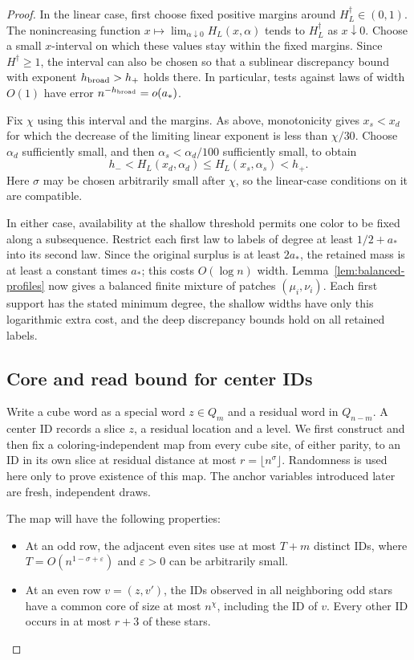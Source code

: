 \begin{proof}
In the linear case, first choose fixed positive margins around \(H_L^\dagger\in(0,1)\). The nonincreasing function
\(x\mapsto\lim_{\alpha\downarrow0}H_L(x,\alpha)\)
tends to \(H_L^\dagger\) as \(x\downarrow0\). Choose a small \(x\)-interval on which these values stay within the fixed margins. Since \(H^\dagger\ge1\), the interval can also be chosen so that a sublinear discrepancy bound with exponent \(h_{\rm broad}>h_+\) holds there. In particular, tests against laws of width \(O(1)\) have error \(n^{-h_{\rm broad}}=o(a_*)\).

Fix \(\chi\) using this interval and the margins. As above, monotonicity gives \(x_s<x_d\) for which the decrease of the limiting linear exponent is less than \(\chi/30\). Choose \(\alpha_d\) sufficiently small, and then \(\alpha_s<\alpha_d/100\) sufficiently small, to obtain
\[
 h_-<H_L(x_d,\alpha_d)\le H_L(x_s,\alpha_s)<h_+.
\]
Here \(\sigma\) may be chosen arbitrarily small after \(\chi\), so the linear-case conditions on it are compatible.

In either case, availability at the shallow threshold permits one color to be fixed along a subsequence. Restrict each first law to labels of degree at least \(1/2+a_*\) into its second law. Since the original surplus is at least \(2a_*\), the retained mass is at least a constant times \(a_*\); this costs \(O(\log n)\) width. Lemma~\ref{lem:balanced-profiles} now gives a balanced finite mixture of patches \((\mu_i,\nu_i)\). Each first support has the stated minimum degree, the shallow widths have only this logarithmic extra cost, and the deep discrepancy bounds hold on all retained labels.

\subsection{Core and read bound for center IDs}
\label{sec:core-and-read-bound-for-center-ids}

Write a cube word as a special word \(z\in Q_m\) and a residual word in \(Q_{n-m}\). A center ID records a slice \(z\), a residual location and a level. We first construct and then fix a coloring-independent map from every cube site, of either parity, to an ID in its own slice at residual distance at most \(r=\lfloor n^\sigma\rfloor\). Randomness is used here only to prove existence of this map. The anchor variables introduced later are fresh, independent draws.

The map will have the following properties:
\begin{itemize}
\item At an odd row, the adjacent even sites use at most \(T+m\) distinct IDs, where \(T=O(n^{1-\sigma+\varepsilon})\) and \(\varepsilon>0\) can be arbitrarily small.
\item At an even row \(v=(z,v')\), the IDs observed in all neighboring odd stars have a common core of size at most \(n^\chi\), including the ID of \(v\). Every other ID occurs in at most \(r+3\) of these stars.
\end{itemize}


\end{proof}
